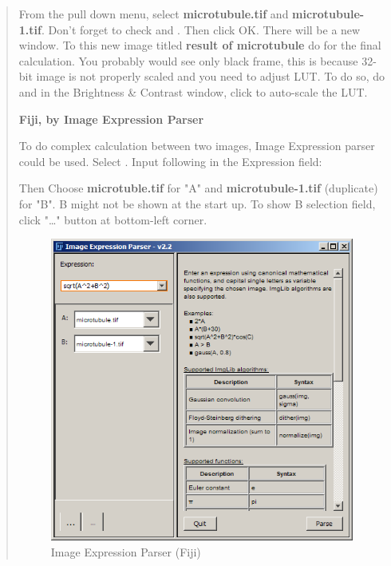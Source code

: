 \begin{indentexercise}{1}
\begin{quote}
From the pull down menu, select \textbf{microtubule.tif} and \textbf{microtubule-1.tif}. Don't forget to check  and . Then click OK.
There will be a new window. To this new image titled \textbf{result of microtubule} do
 for the final calculation. 
You probably would see only black frame, this is
because 32-bit image is not properly scaled and you need to adjust LUT.
To do so, do 
and in the Brightness \& Contrast window, click  to auto-scale the LUT.


\textbf{Fiji, by Image Expression Parser}

To do complex calculation between two images, Image Expression
parser could be used. Select . Input
following in the Expression field:



Then Choose \textbf{microtuble.tif} for "A"
and \textbf{microtubule-1.tif} (duplicate) for
"B". B might not be shown at the
start up. To show B selection field, click
"\ldots" button at bottom-left corner.
\begin{figure}[htbp]
\begin{center}
\includegraphics[width=10cm]{img/CMCIBasicCourse201102-img111.png}
\caption{ Image Expression Parser (Fiji)}
\label{fig:ImageExpressionParser}
\end{center}
\end{figure}

\end{quote}


\end{indentexercise}
